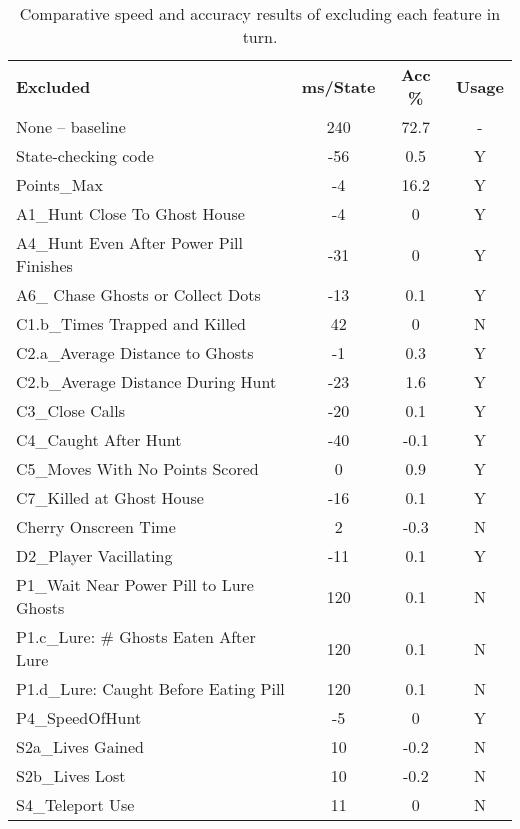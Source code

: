 \documentclass[conference]{IEEEtran}
\begin{document}
\begin{table}[ht]
	\centering
	\caption{Comparative speed and accuracy results of excluding each feature in turn.}
	\label{table:loo}
	\begin{tabular}{lccc}
		\textbf{Excluded} & \textbf{ms/State} & \textbf{Acc \%} & \textbf{Usage} \\
		None – baseline                         & 240 & 72.7 & -\\
		State-checking code                 & -56 & 0.5 & Y \\
		Points\_Max                             & -4 & 16.2 & Y \\
		A1\_Hunt Close To Ghost House           & -4 & 0 & Y \\
		A4\_Hunt Even After Power Pill Finishes & -31 & 0 & Y \\
		A6\_ Chase Ghosts or Collect Dots       & -13 & 0.1 & Y \\
		C1.b\_Times Trapped and Killed          & 42 & 0 & N \\
		C2.a\_Average Distance to Ghosts    & -1 & 0.3 & Y \\
		C2.b\_Average Distance During Hunt      & -23 & 1.6 & Y \\
		C3\_Close Calls                         & -20 & 0.1 & Y \\
		C4\_Caught After Hunt                   & -40 & -0.1 & Y \\
		C5\_Moves With No Points Scored         & 0 & 0.9 & Y \\
		C7\_Killed at Ghost House               & -16 & 0.1 & Y \\
		Cherry Onscreen Time                    & 2 & -0.3 & N \\
		D2\_Player Vacillating                  & -11 & 0.1 & Y \\
		P1\_Wait Near Power Pill to Lure Ghosts & 120 & 0.1 & N \\
		P1.c\_Lure: \# Ghosts Eaten After Lure  & 120 & 0.1 & N \\
		P1.d\_Lure: Caught Before Eating Pill   & 120 & 0.1 & N \\
		P4\_SpeedOfHunt                         & -5 & 0 & Y \\
		S2a\_Lives Gained                       & 10 & -0.2 & N \\
		S2b\_Lives Lost                         & 10 & -0.2 & N \\
		S4\_Teleport Use                        & 11 & 0 & N
	\end{tabular}
\end{table}
\end{document}

